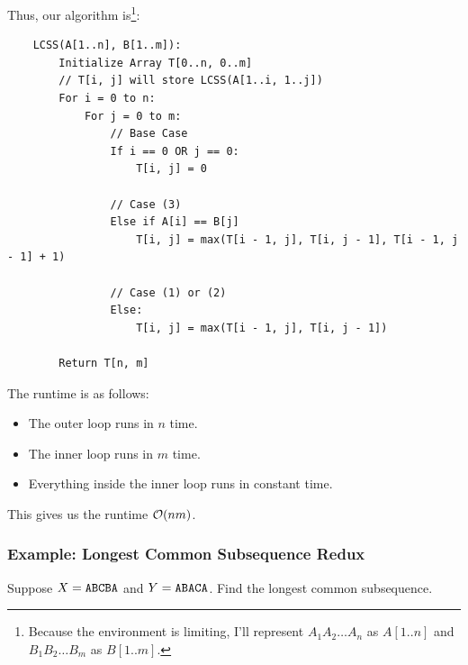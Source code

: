 \documentclass[letterpaper]{article}
\begin{document}
Thus, our algorithm is\footnote{Because the  environment is limiting, I'll represent $A_1 A_2 \dots A_n$ as $A[1..n]$ and $B_1 B_2 \dots B_m$ as $B[1..m]$.}: 
\begin{verbatim}
    LCSS(A[1..n], B[1..m]):
        Initialize Array T[0..n, 0..m]
        // T[i, j] will store LCSS(A[1..i, 1..j])
        For i = 0 to n: 
            For j = 0 to m:
                // Base Case 
                If i == 0 OR j == 0: 
                    T[i, j] = 0
                
                // Case (3)
                Else if A[i] == B[j]
                    T[i, j] = max(T[i - 1, j], T[i, j - 1], T[i - 1, j - 1] + 1)
                
                // Case (1) or (2)
                Else: 
                    T[i, j] = max(T[i - 1, j], T[i, j - 1])

        Return T[n, m]
\end{verbatim}
The runtime is as follows: 
\begin{itemize}
    \item The outer loop runs in $n$ time. 
    \item The inner loop runs in $m$ time. 
    \item Everything inside the inner loop runs in constant time. 
\end{itemize}
This gives us the runtime $\mathcal{O}(nm)$. 

\subsubsection{Example: Longest Common Subsequence Redux}
Suppose $X = \texttt{ABCBA}$ and $Y = \texttt{ABACA}$. Find the longest common subsequence.
\end{document}
